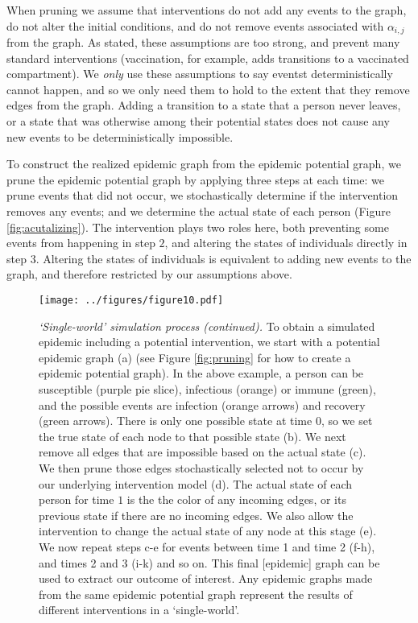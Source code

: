 \documentclass[PTRSB]{rsos}
\makeatletter
\def\checkGraphicsWidth{\ifdim\Gin@nat@width>\linewidth
	\tsGraphicsScaleX\linewidth\else\Gin@nat@width\fi}
\let\ts@includegraphics\includegraphics
\renewcommand{\includegraphics}[1]{\ts@includegraphics[width=\checkGraphicsWidth]{#1}}
\makeatother
\begin{document}
\begin{multicols}{2}
When pruning we assume that interventions do not add any events to the graph, do not alter the initial conditions, and do not remove events associated with $\alpha_{i,j}$ from the graph.
As stated, these assumptions are too strong, and prevent many standard interventions (vaccination, for example, adds transitions to a vaccinated compartment).
We \emph{only} use these assumptions to say eventst deterministically cannot happen, and so we only need them to hold to the extent that they remove edges from the graph.
Adding a transition to a state that a person never leaves, or a state that was otherwise among their potential states does not cause any new events to be deterministically impossible.

To construct the realized epidemic graph from the epidemic potential graph, we prune the epidemic potential graph by applying three steps at each time: we prune events that did not occur, we stochastically determine if the intervention removes any events; and we determine the actual state of each person (Figure \ref{fig:acutalizing}).
The intervention plays two roles here, both preventing some events from happening in step $2$, and altering the states of individuals directly in step $3$.
Altering the states of individuals is equivalent to adding new events to the graph, and therefore restricted by our assumptions above.

\begin{figure}[hp]
\texttt{[image: ../figures/figure10.pdf]}
\caption{\textit{‘Single-world’ simulation process (continued).}
  To obtain a simulated epidemic including a potential intervention, we start with a potential epidemic graph (a) (see Figure \ref{fig:pruning} for how to create a epidemic potential graph).
  In the above example, a person can be susceptible (purple pie slice), infectious (orange) or immune (green), and the possible events are infection (orange arrows) and recovery (green arrows). %
  There is only one possible state at time $0$, so we set the true state of each node to that possible state (b).
  We next remove all edges that are impossible based on the actual state (c). %
  We then prune those edges stochastically selected not to occur by our underlying intervention model (d).
  The actual state of each person for time $1$ is the the color of any incoming edges, or its previous state if there are no incoming edges.
  We also allow the intervention to change the actual state of any node at this stage (e).
  We now repeat steps c-e for events between time 1 and time 2 (f-h), and times 2 and 3 (i-k) and so on.
  This final [epidemic] graph can be used to extract our outcome of interest.
  Any epidemic graphs made from the same epidemic potential graph represent the results of different interventions in a `single-world'.
}
\label{fig:actualizing}
\end{figure}


\end{multicols}
\end{document}

